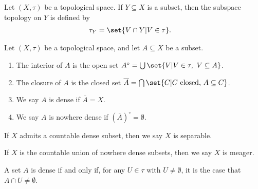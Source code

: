 \begin{definition}[]
Let $\left(X,\tau\right)$ be a topological space. If $Y\subseteq X$ is a subset, then the subspace topology on $Y$ is defined by
\begin{align*}
  \tau_{Y} &= \set{V\cap Y | V\in \tau}.
\end{align*}

\end{definition}
\begin{definition}
  Let $\left(X,\tau\right)$ be a topological space, and let $A\subseteq X$ be a subset.
  \begin{enumerate}[(1)]
    \item The interior of $A$ is the open set $A^{\circ} = \bigcup\set{V | V\in\tau,~V\subseteq A}$.
    \item The closure of $A$ is the closed set $\overline{A} = \bigcap\set{C| C\text{ closed, }A\subseteq C}$.
    \item We say $A$ is dense if $\overline{A} = X$.
    \item We say $A$ is nowhere dense if $\left(\overline{A}\right)^{\circ} = \emptyset$.
  \end{enumerate}
  If $X$ admits a countable dense subset, then we say $X$ is separable.\newline

  If $X$ is the countable union of nowhere dense subsets, then we say $X$ is meager.
\end{definition}
\begin{remark}
  A set $A$ is dense if and only if, for any $U\in \tau$ with $U\neq \emptyset$, it is the case that $A\cap U \neq \emptyset$.
\end{remark}

